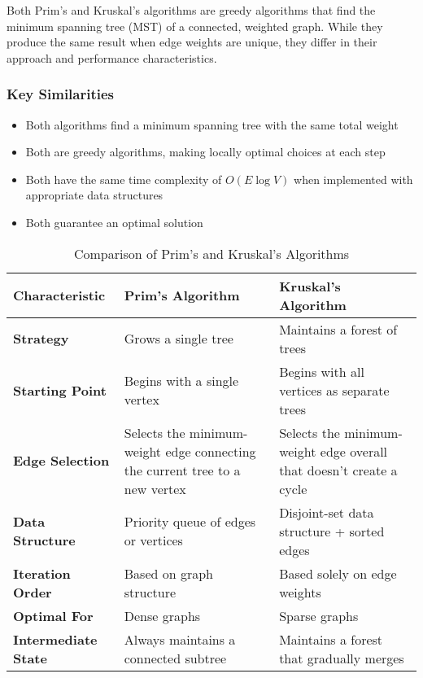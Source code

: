 \documentclass{article}
\theoremstyle{definition}
\begin{document}
Both Prim's and Kruskal's algorithms are greedy algorithms that find the minimum spanning tree (MST) of a connected, weighted graph. While they produce the same result when edge weights are unique, they differ in their approach and performance characteristics.

\subsubsection{Key Similarities}

\begin{itemize}
\item Both algorithms find a minimum spanning tree with the same total weight
\item Both are greedy algorithms, making locally optimal choices at each step
\item Both have the same time complexity of $O(E \log V)$ when implemented with appropriate data structures
\item Both guarantee an optimal solution
\end{itemize}

\begin{table}[h]
\centering
\begin{tabular}{|p{3cm}|p{5cm}|p{5cm}|}
\hline
\textbf{Characteristic} & \textbf{Prim's Algorithm} & \textbf{Kruskal's Algorithm} \\
\hline
\textbf{Strategy} & Grows a single tree & Maintains a forest of trees \\
\hline
\textbf{Starting Point} & Begins with a single vertex & Begins with all vertices as separate trees \\
\hline
\textbf{Edge Selection} & Selects the minimum-weight edge connecting the current tree to a new vertex & Selects the minimum-weight edge overall that doesn't create a cycle \\
\hline
\textbf{Data Structure} & Priority queue of edges or vertices & Disjoint-set data structure + sorted edges \\
\hline
\textbf{Iteration Order} & Based on graph structure & Based solely on edge weights \\
\hline
\textbf{Optimal For} & Dense graphs & Sparse graphs \\
\hline
\textbf{Intermediate State} & Always maintains a connected subtree & Maintains a forest that gradually merges \\
\hline
\end{tabular}
\caption{Comparison of Prim's and Kruskal's Algorithms}
\label{tab:comparison}
\end{table}
\end{document}
